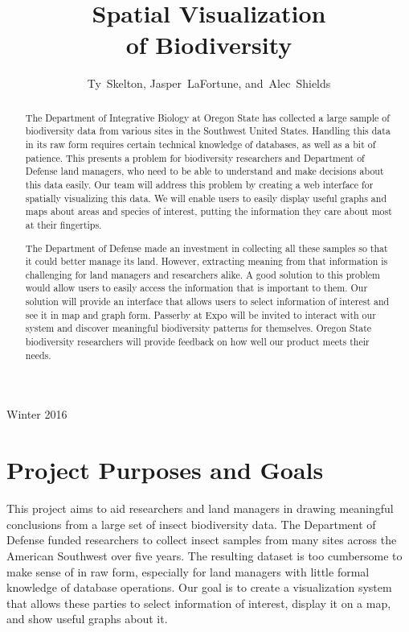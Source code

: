 \documentclass[10pt,draftclsnofoot,onecolumn]{IEEEtran}
\begin{document}
\singlespacing
\title{Spatial Visualization\\ of Biodiversity}

\author{Ty~Skelton,
        Jasper~LaFortune,
        and~Alec~Shields}%


%
{Winter 2016}

\maketitle

\begin{abstract} %
The Department of Integrative Biology at Oregon State has collected a large sample of biodiversity data from various sites in the Southwest United States.
Handling this data in its raw form requires certain technical knowledge of databases, as well as a bit of patience.
This presents a problem for biodiversity researchers and Department of Defense land managers, who need to be able to understand and make decisions about this data easily.
Our team will address this problem by creating a web interface for spatially visualizing this data.
We will enable users to easily display useful graphs and maps about areas and species of interest, putting the information they care about most at their fingertips.

The Department of Defense made an investment in collecting all these samples so that it could better manage its land.
However, extracting meaning from that information is challenging for land managers and researchers alike.
A good solution to this problem would allow users to easily access the information that is important to them.
Our solution will provide an interface that allows users to select information of interest and see it in map and graph form.
Passerby at Expo will be invited to interact with our system and discover meaningful biodiversity patterns for themselves.
Oregon State biodiversity researchers will provide feedback on how well our product meets their needs.

\end{abstract}
\IEEEpeerreviewmaketitle

\newpage
{}

\section{Project Purposes and Goals} %
This project aims to aid researchers and land managers in drawing meaningful conclusions from a large set of insect biodiversity data.
The Department of Defense funded researchers to collect insect samples from many sites across the American Southwest over five years.
The resulting dataset is too cumbersome to make sense of in raw form, especially for land managers with little formal knowledge of database operations.
Our goal is to create a visualization system that allows these parties to select information of interest, display it on a map, and show useful graphs about it.
\end{document}
